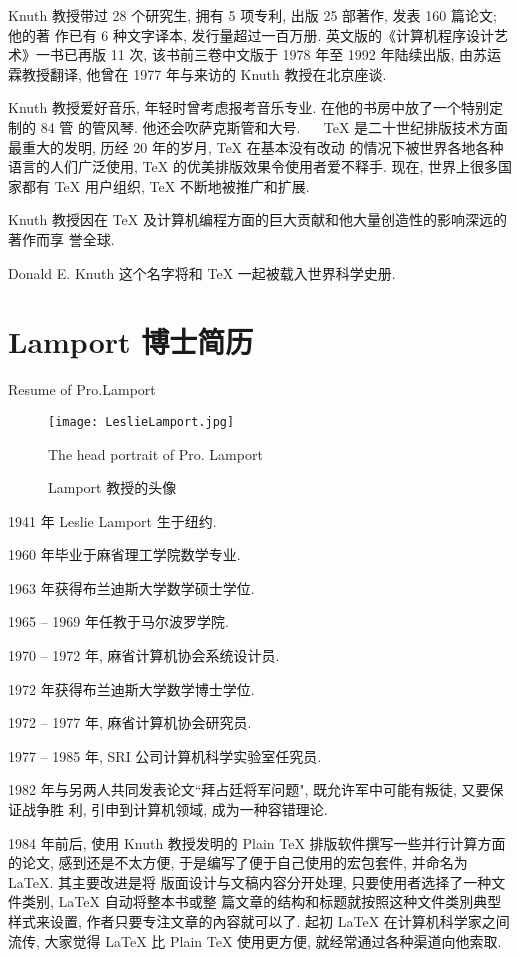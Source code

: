 Knuth 教授带过 28 个研究生, 拥有 5 项专利, 出版 25 部著作, 发表 160 篇论文; 他的著
作已有 6 种文字译本, 发行量超过一百万册. 英文版的《计算机程序设计艺术》一书已再版
11 次, 该书前三卷中文版于 1978 年至 1992 年陆续出版, 由苏运霖教授翻译, 他曾在 1977
年与来访的 Knuth 教授在北京座谈.

Knuth 教授爱好音乐, 年轻时曾考虑报考音乐专业. 在他的书房中放了一个特别定制的 84 管
的管风琴. 他还会吹萨克斯管和大号.
           　
\TeX{} 是二十世纪排版技术方面最重大的发明, 历经 20 年的岁月, \TeX{} 在基本没有改动
的情况下被世界各地各种语言的人们广泛使用, \TeX{} 的优美排版效果令使用者爱不释手.
现在, 世界上很多国家都有 \TeX{} 用户组织, \TeX{} 不断地被推广和扩展.

Knuth 教授因在 \TeX{} 及计算机编程方面的巨大贡献和他大量创造性的影响深远的著作而享
誉全球.

Donald E. Knuth 这个名字将和 \TeX{} 一起被载入世界科学史册.

\section{Lamport 博士简历}{Resume of Pro.Lamport}

\begin{figure}
  \centering
  \texttt{[image: LeslieLamport.jpg]}\\
  \caption{Lamport 教授的头像}{The head portrait of Pro. Lamport}
\end{figure}

1941 年 Leslie Lamport 生于纽约.

1960 年毕业于麻省理工学院数学专业.

1963 年获得布兰迪斯大学数学硕士学位.

1965 -- 1969 年任教于马尔波罗学院.

1970 -- 1972 年, 麻省计算机协会系统设计员.

1972 年获得布兰迪斯大学数学博士学位.

1972 -- 1977 年, 麻省计算机协会研究员.

1977 -- 1985 年, SRI 公司计算机科学实验室任究员.

1982 年与另两人共同发表论文``拜占廷将军问题", 既允许军中可能有叛徒, 又要保证战争胜
利, 引申到计算机领域, 成为一种容错理论.

1984 年前后, 使用 Knuth 教授发明的 Plain \TeX{} 排版软件撰写一些并行计算方面的论文,
感到还是不太方便, 于是编写了便于自己使用的宏包套件, 并命名为 \LaTeX. 其主要改进是将
版面设计与文稿内容分开处理, 只要使用者选择了一种文件类别, \LaTeX{} 自动将整本书或整
篇文章的结构和标题就按照这种文件类別典型样式来设置, 作者只要专注文章的內容就可以了.
起初 \LaTeX{} 在计算机科学家之间流传, 大家觉得 \LaTeX{} 比 Plain \TeX{} 使用更方便,
就经常通过各种渠道向他索取.


